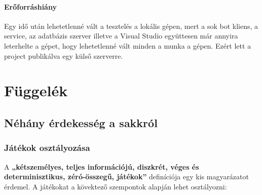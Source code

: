 \documentclass[twoside, a4paper, 12pt]{book}
\begin{document}
\subsection{Erőforráshiány}
Egy idő után lehetetlenné vált a tesztelés a lokális gépen, mert a sok bot kliens, a service, az adatbázis szerver illetve a Visual Studio együttesen már annyira leterhelte a gépet, hogy lehetetlenné vált minden a munka a gépen. Ezért lett a project publikálva egy külső szerverre.




\newpage
\part{Függelék}
\chapter{Néhány érdekesség a sakkról}
\section{Játékok osztályozása}
A \textbf{„kétszemélyes, teljes információjú, diszkrét, véges és determinisztikus, zéró-összegű, játékok”} definíciója egy kis magyarázatot érdemel. A játékokat a kövektező szempontok alapján lehet osztályozni:
\end{document}
